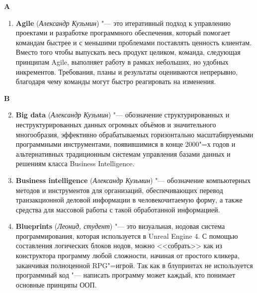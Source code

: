 \begin{flushleft} \large\textbf{A} \end{flushleft}

\begin{enumerate}
    \setcounter{enumi}{0}

    \item \textbf{Agile} (\textit{Александр Кузьмин}) "--- 
    это итеративный подход к управлению проектами и разработке программного обеспечения, который помогает командам быстрее и с меньшими проблемами поставлять ценность клиентам. Вместо того чтобы выпускать весь продукт целиком, команда, следующая принципам Agile, выполняет работу в рамках небольших, но удобных инкрементов. Требования, планы и результаты оцениваются непрерывно, благодаря чему команды могут быстро реагировать на изменения.
    
\end{enumerate}

\begin{flushleft} \large\textbf{B} \end{flushleft}

\begin{enumerate}
    \setcounter{enumi}{1}

    \item \textbf{Big data} (\textit{Александр Кузьмин}) "--- 
    обозначение структурированных и неструктурированных данных огромных объёмов и значительного многообразия, эффективно обрабатываемых горизонтально масштабируемыми программными инструментами, появившимися в конце 2000"=х годов и альтернативных традиционным системам управления базами данных и решениям класса Business Intelligence.

    \item \textbf{Business intelligence} (\textit{Александр Кузьмин}) "---
     обозначение компьютерных методов и инструментов для организаций, обеспечивающих перевод транзакционной деловой информации в человекочитаемую форму, а также средства для массовой работы с такой обработанной информацией.

    \item \textbf{Blueprints} (\textit{Леонид, студент}) "---
      это визуальная, нодовая система программирования, которая используется в Unreal Engine 4. С помощью составления логических блоков нодов, можно <<собрать>> как из конструктора программу любой сложности, начиная от простого кликера, заканчивая полноценной RPG"=игрой. Так как в блупринтах не используется программный код "--- написать программу может каждый, кто понимает основные принципы ООП.
     
\end{enumerate}

